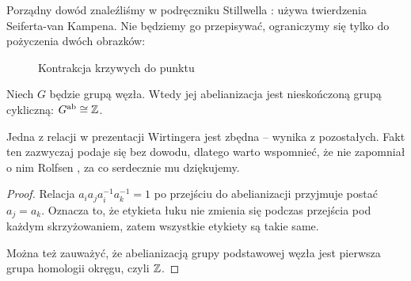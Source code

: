 Porządny dowód znaleźliśmy w podręczniku Stillwella \cite[s. 144-147]{stillwell1993}: używa twierdzenia Seiferta-van Kampena.
Nie będziemy go przepisywać, ograniczymy się tylko do pożyczenia dwóch obrazków:

\begin{figure}[H]
    \centering

    \caption[caption-stillwell]{Kontrakcja krzywych do punktu}
\end{figure}

\begin{corollary}
    Niech $G$ będzie grupą węzła.
    Wtedy jej abelianizacja jest nieskończoną grupą cykliczną: $G^{\operatorname{ab}} \cong \mathbb Z$.
\end{corollary}

Jedna z relacji w prezentacji Wirtingera jest zbędna -- wynika z pozostałych.
Fakt ten zazwyczaj podaje się bez dowodu, dlatego warto wspomnieć, że nie zapomniał o nim Rolfsen \cite[s. 56-60]{rolfsen1976}, za co serdecznie mu dziękujemy.

\begin{proof}
    Relacja $a_ia_ja_i^{-1}a_k^{-1}=1$ po przejściu do abelianizacji przyjmuje postać $a_j = a_k$.
    Oznacza to, że etykieta łuku nie zmienia się podczas przejścia pod każdym skrzyżowaniem, zatem wszystkie etykiety są takie same.

    Można też zauważyć, że abelianizacją grupy podstawowej węzła jest pierwsza grupa homologii okręgu, czyli $\mathbb Z$.
\end{proof}

